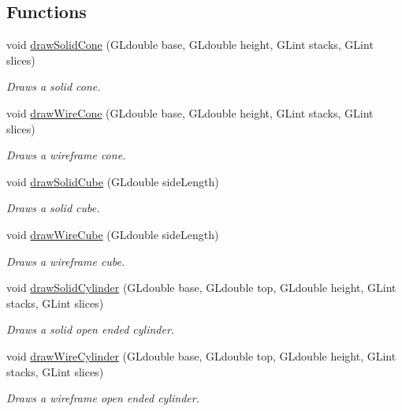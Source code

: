 \subsection*{Functions}
\begin{DoxyCompactItemize}
\item 
void \hyperlink{namespace_c_s_c_i441_a484e60eb6fb39efef552b7838ca35164}{draw\+Solid\+Cone} (G\+Ldouble base, G\+Ldouble height, G\+Lint stacks, G\+Lint slices)
\begin{DoxyCompactList}\small\item\em Draws a solid cone. \end{DoxyCompactList}\item 
void \hyperlink{namespace_c_s_c_i441_a2727745ad139fd358f53514fe358683e}{draw\+Wire\+Cone} (G\+Ldouble base, G\+Ldouble height, G\+Lint stacks, G\+Lint slices)
\begin{DoxyCompactList}\small\item\em Draws a wireframe cone. \end{DoxyCompactList}\item 
void \hyperlink{namespace_c_s_c_i441_a6ae4602d63b3a3313b6156a12ef4d066}{draw\+Solid\+Cube} (G\+Ldouble side\+Length)
\begin{DoxyCompactList}\small\item\em Draws a solid cube. \end{DoxyCompactList}\item 
void \hyperlink{namespace_c_s_c_i441_a6259740595e9b9607caa5209f73bf3cf}{draw\+Wire\+Cube} (G\+Ldouble side\+Length)
\begin{DoxyCompactList}\small\item\em Draws a wireframe cube. \end{DoxyCompactList}\item 
void \hyperlink{namespace_c_s_c_i441_ae5fbc355c04fd762dcdda56a1954e2c6}{draw\+Solid\+Cylinder} (G\+Ldouble base, G\+Ldouble top, G\+Ldouble height, G\+Lint stacks, G\+Lint slices)
\begin{DoxyCompactList}\small\item\em Draws a solid open ended cylinder. \end{DoxyCompactList}\item 
void \hyperlink{namespace_c_s_c_i441_a54ad17945aa0a173ba8b888b33f80839}{draw\+Wire\+Cylinder} (G\+Ldouble base, G\+Ldouble top, G\+Ldouble height, G\+Lint stacks, G\+Lint slices)
\begin{DoxyCompactList}\small\item\em Draws a wireframe open ended cylinder. \end{DoxyCompactList}\item 

\end{DoxyCompactItemize}
